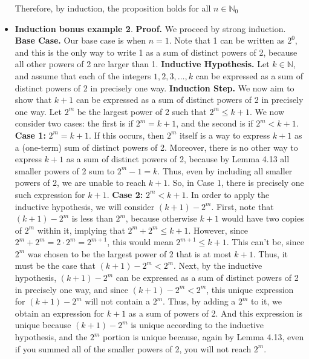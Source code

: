 \documentclass{report}
\begin{document}
\begin{itemize}
{            }
            \bigbreak \noindent 
            Therefore, by induction, the proposition holds for all $n\in \mathbb{N}_{0} $
            \bigbreak \noindent 
        \item \textbf{Induction bonus example 2}. \textbf{Proof.} We proceed by strong induction.
            \textbf{Base Case.} Our base case is when \( n = 1 \). Note that 1 can be written as \( 2^0 \), and this is the only way to write 1 as a sum of distinct powers of 2, because all other powers of 2 are larger than 1.
            \bigbreak \noindent 
            \textbf{Inductive Hypothesis.} Let \( k \in \mathbb{N} \), and assume that each of the integers \( 1, 2, 3, \dots, k \) can be expressed as a sum of distinct powers of 2 in precisely one way.
            \bigbreak \noindent 
            \textbf{Induction Step.} We now aim to show that \( k+1 \) can be expressed as a sum of distinct powers of 2 in precisely one way.
            \bigbreak \noindent 
            Let \( 2^m \) be the largest power of 2 such that \( 2^m \leq k+1 \). We now consider two cases: the first is if \( 2^m = k+1 \), and the second is if \( 2^m < k+1 \).
            \bigbreak \noindent 
            \textbf{Case 1:} \( 2^m = k+1 \). If this occurs, then \( 2^m \) itself is a way to express \( k+1 \) as a (one-term) sum of distinct powers of 2. Moreover, there is no other way to express \( k+1 \) as a sum of distinct powers of 2, because by Lemma 4.13 all smaller powers of 2 sum to \( 2^m - 1 = k \). Thus, even by including all smaller powers of 2, we are unable to reach \( k+1 \). So, in Case 1, there is precisely one such expression for \( k+1 \).
            \bigbreak \noindent 
            \textbf{Case 2:} \( 2^m < k+1 \). In order to apply the inductive hypothesis, we will consider \( (k+1) - 2^m \). First, note that \( (k+1) - 2^m \) is less than \( 2^m \), because otherwise \( k+1 \) would have two copies of \( 2^m \) within it, implying that \( 2^m + 2^m \leq k+1 \). However, since \( 2^m + 2^m = 2 \cdot 2^m = 2^{m+1} \), this would mean \( 2^{m+1} \leq k+1 \). This can't be, since \( 2^m \) was chosen to be the largest power of 2 that is at most \( k+1 \). Thus, it must be the case that \( (k+1) - 2^m < 2^m \).
            \bigbreak \noindent 
            Next, by the inductive hypothesis, \( (k+1) - 2^m \) can be expressed as a sum of distinct powers of 2 in precisely one way, and since \( (k+1) - 2^m < 2^m \), this unique expression for \( (k+1) - 2^m \) will not contain a \( 2^m \). Thus, by adding a \( 2^m \) to it, we obtain an expression for \( k+1 \) as a sum of powers of 2. And this expression is unique because \( (k+1) - 2^m \) is unique according to the inductive hypothesis, and the \( 2^m \) portion is unique because, again by Lemma 4.13, even if you summed all of the smaller powers of 2, you will not reach \( 2^m \).

\end{itemize}
\end{document}
